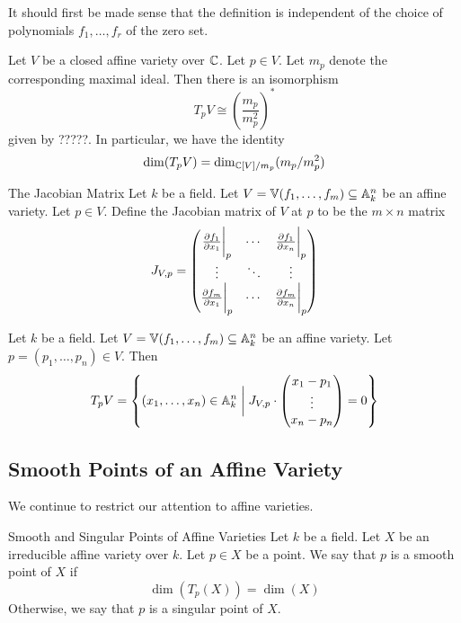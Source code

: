 \documentclass[a4paper]{article}
\begin{document}
It should first be made sense that the definition is independent of the choice of polynomials $f_1,\dots,f_r$ of the zero set. 

\begin{prp}{}{} Let $V$ be a closed affine variety over $\mathbb{C}$. Let $p\in V$. Let $m_p$ denote the corresponding maximal ideal. Then there is an isomorphism $$T_pV\cong\left(\frac{m_p}{m_p^2}\right)^\ast$$ given by ?????. In particular, we have the identity $$\dim(T_pV)=\dim_{\mathbb{C}[V]/m_p}(m_p/m_p^2)$$
\end{prp}

\begin{defn}{The Jacobian Matrix}{} Let $k$ be a field. Let $V=\mathbb{V}(f_1,\dots,f_m)\subseteq\mathbb{A}_k^n$ be an affine variety. Let $p\in V$. Define the Jacobian matrix of $V$ at $p$ to be the $m\times n$ matrix $$J_{V,p}=\begin{pmatrix}
\frac{\partial f_1}{\partial x_1}\bigg{|}_p & \cdots & \frac{\partial f_1}{\partial x_n}\bigg{|}_p\\
\vdots & \ddots & \vdots\\
\frac{\partial f_m}{\partial x_1}\bigg{|}_p & \cdots & \frac{\partial f_m}{\partial x_n}\bigg{|}_p
\end{pmatrix}$$
\end{defn}

\begin{prp}{}{} Let $k$ be a field. Let $V=\mathbb{V}(f_1,\dots,f_m)\subseteq\mathbb{A}_k^n$ be an affine variety. Let $p=(p_1,\dots,p_n)\in V$. Then $$T_pV=\left\{(x_1,\dots,x_n)\in\mathbb{A}_k^n\;\bigg{|}\;J_{V,p}\cdot\begin{pmatrix}x_1-p_1\\\vdots\\x_n-p_n\end{pmatrix}=0\right\}$$
\end{prp}

\subsection{Smooth Points of an Affine Variety}
We continue to restrict our attention to affine varieties. 

\begin{defn}{Smooth and Singular Points of Affine Varieties}{} Let $k$ be a field. Let $X$ be an irreducible affine variety over $k$. Let $p\in X$ be a point. We say that $p$ is a smooth point of $X$ if $$\dim(T_p(X))=\dim(X)$$ Otherwise, we say that $p$ is a singular point of $X$. 
\end{defn}
\end{document}
